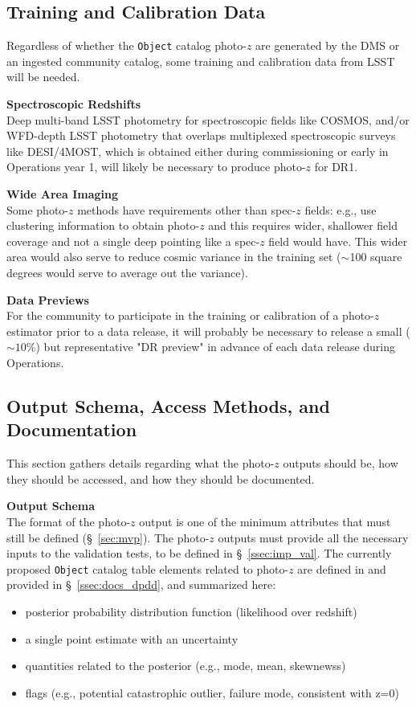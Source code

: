 \documentclass[DM,lsstdraft,toc]{lsstdoc}
\begin{document}
\subsection{Training and Calibration Data}\label{ssec:dp_calib}

Regardless of whether the {\tt Object} catalog photo-$z$ are generated by the DMS or an ingested community catalog, some training and calibration data from LSST will be needed.

{\bf Spectroscopic Redshifts}\\
Deep multi-band LSST photometry for spectroscopic fields like COSMOS, and/or WFD-depth LSST photometry that overlaps multiplexed spectroscopic surveys like DESI/4MOST, which is obtained either during commissioning or early in Operations year 1, will likely be necessary to produce photo-$z$ for DR1.

{\bf Wide Area Imaging}\\
Some photo-$z$ methods have requirements other than spec-$z$ fields: e.g., \citet{2019MNRAS.483.2801S} use clustering information to obtain photo-$z$ and this requires wider, shallower field coverage and not a single deep pointing like a spec-$z$ field would have. 
This wider area would also serve to reduce cosmic variance in the training set ($\sim$100 square degrees would serve to average out the variance).

{\bf Data Previews}\\
For the community to participate in the training or calibration of a photo-$z$ estimator prior to a data release, it will probably be necessary to release a small ($\sim10\%$) but representative "DR preview" in advance of each data release during Operations.


\subsection{Output Schema, Access Methods, and Documentation}\label{ssec:dp_pz}

This section gathers details regarding what the photo-$z$ outputs should be, how they should be accessed, and how they should be documented.

{\bf Output Schema}\\
The format of the photo-$z$ output is one of the minimum attributes that must still be defined (\S~\ref{sec:mvp}). 
The photo-$z$ outputs must provide all the necessary inputs to the validation tests, to be defined in \S~\ref{ssec:imp_val}.
The currently proposed {\tt Object} catalog table elements related to photo-$z$ are defined in  and provided in \S~\ref{ssec:docs_dpdd}, and summarized here:
\vspace{-15pt}
\begin{itemize}
\item posterior probability distribution function (likelihood over redshift)
\item a single point estimate with an uncertainty
\item quantities related to the posterior (e.g., mode, mean, skewnewss)
\item flags (e.g., potential catastrophic outlier, failure mode, consistent with z=0)
\end{itemize}
\end{document}
